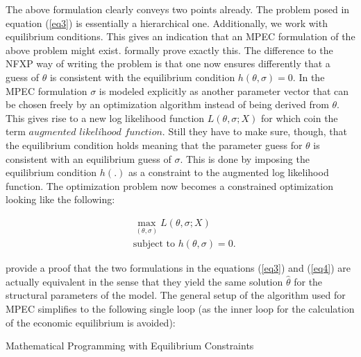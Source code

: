 The above formulation clearly conveys two points already. The problem posed in equation (\ref{eq3}) is essentially a hierarchical one. Additionally, we work with equilibrium conditions. This gives an indication that an MPEC formulation of the above problem might exist. \cite{Su.Judd.2012} formally prove exactly this. The difference to the NFXP way of writing the problem is that one now ensures differently that a guess of $\theta$ is consistent with the equilibrium condition $h(\theta, \sigma)=0$. In the MPEC formulation $\sigma$ is modeled explicitly as another parameter vector that can be chosen freely by an optimization algorithm instead of being derived from $\theta$. This gives rise to a new log likelihood function $L(\theta, \sigma; X)$ for which \citeauthor{Su.Judd.2012} coin the term $\textit{augmented likelihood function}$. Still they have to make sure, though, that the equilibrium condition holds meaning that the parameter guess for $\theta$ is consistent with an equilibrium guess of $\sigma$. This is done by imposing the equilibrium condition $h(.)$ as a constraint to the augmented log likelihood function. The optimization problem now becomes a constrained optimization looking like the following:

\begin{equation}
	\begin{aligned}
		& \max_{(\theta, \sigma)} L(\theta, \sigma; X) \\
		& \text{subject to } h(\theta, \sigma) = 0.
	\end{aligned}
	\label{eq4}
\end{equation}

\cite{Su.Judd.2012} provide a proof that the two formulations in the equations (\ref{eq3}) and (\ref{eq4}) are actually equivalent in the sense that they yield the same solution $\hat\theta$ for the structural parameters of the model. The general setup of the algorithm used for MPEC simplifies to the following single loop (as the inner loop for the calculation of the economic equilibrium is avoided):

\vspace{2ex}
\begin{algorithm}[H]
	\SetAlgoLined
	\caption{Mathematical Programming with Equilibrium Constraints}
\end{algorithm}
\vspace{2ex}

